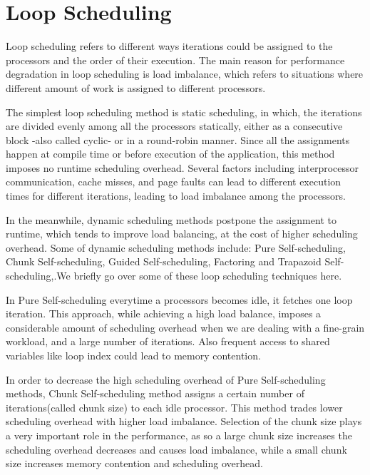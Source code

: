 \section{Loop Scheduling}
Loop scheduling refers to different ways iterations could be assigned to the processors and the order of their execution. 
The main reason for performance degradation in loop scheduling is load imbalance, which refers to situations where different amount of work is assigned to different processors\cite{ciorba2018openmp}.    

The simplest loop scheduling method is static scheduling, in which, the iterations are divided evenly among all the processors statically, either as a consecutive block -also called cyclic- or in a round-robin manner\cite{liu1994safe}. Since all the assignments happen at compile time or before execution of the application, this method imposes no runtime scheduling overhead. Several factors including interprocessor communication, cache misses, and page faults can lead to different execution times for different iterations, leading to load imbalance among the processors\cite{philip1995increasing}.

In the meanwhile, dynamic scheduling methods postpone the assignment to runtime, which tends to improve load balancing, at the cost of higher scheduling overhead. Some of dynamic scheduling methods include: Pure Self-scheduling, Chunk Self-scheduling, Guided Self-scheduling\cite{polychronopoulos1987guided}, Factoring\cite{hummel1992factoring} and Trapazoid Self-scheduling\cite{tzen1993trapezoid},\cite{liu1994safe}.We briefly go over some of these loop scheduling techniques here.


In Pure Self-scheduling everytime a processors becomes idle, it fetches one loop iteration. This approach, while achieving a high load balance, imposes a considerable amount of scheduling overhead when we are dealing with a fine-grain workload, and a large number of iterations. Also frequent access to shared variables like loop index could lead to memory contention\cite{liu1994safe}. 

In order to decrease the high scheduling overhead of Pure Self-scheduling methods, Chunk Self-scheduling method assigns a certain number of iterations(called chunk size) to each idle processor. This method trades lower scheduling overhead with higher load imbalance. Selection of the chunk size plays a very important role in the performance, as so a large chunk size increases the scheduling overhead decreases and causes load imbalance, while a small chunk size increases memory contention and scheduling overhead\cite{liu1994safe}. 

